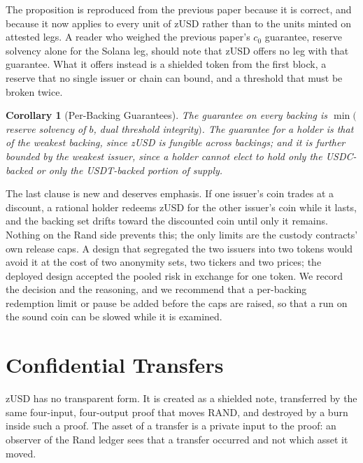 \documentclass[11pt,a4paper]{article}
\newtheorem{corollary}[theorem]{Corollary}
\begin{document}
The proposition is reproduced from the previous paper because it is correct, and because it now applies to every unit of zUSD rather than to the units minted on attested legs. A reader who weighed the previous paper's $c_0$ guarantee, reserve solvency alone for the Solana leg, should note that zUSD offers no leg with that guarantee. What it offers instead is a shielded token from the first block, a reserve that no single issuer or chain can bound, and a threshold that must be broken twice.

\begin{corollary}[Per-Backing Guarantees]
\label{cor:perbacking}
The guarantee on every backing is $\min($reserve solvency of $b$, dual threshold integrity$)$. The guarantee for a holder is that of the weakest backing, since zUSD is fungible across backings; and it is further bounded by the weakest \emph{issuer}, since a holder cannot elect to hold only the USDC-backed or only the USDT-backed portion of supply.
\end{corollary}

The last clause is new and deserves emphasis. If one issuer's coin trades at a discount, a rational holder redeems zUSD for the other issuer's coin while it lasts, and the backing set drifts toward the discounted coin until only it remains. Nothing on the Rand side prevents this; the only limits are the custody contracts' own release caps. A design that segregated the two issuers into two tokens would avoid it at the cost of two anonymity sets, two tickers and two prices; the deployed design accepted the pooled risk in exchange for one token. We record the decision and the reasoning, and we recommend that a per-backing redemption limit or pause be added before the caps are raised, so that a run on the sound coin can be slowed while it is examined.

\section{Confidential Transfers}

zUSD has no transparent form. It is created as a shielded note, transferred by the same four-input, four-output proof that moves RAND, and destroyed by a burn inside such a proof. The asset of a transfer is a private input to the proof: an observer of the Rand ledger sees that a transfer occurred and not which asset it moved.
\end{document}
